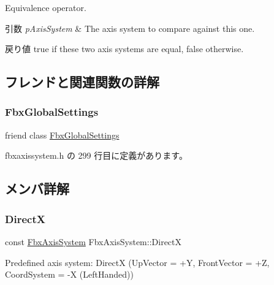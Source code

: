 Equivalence operator. 
\begin{DoxyParams}{引数}
{\em p\+Axis\+System} & The axis system to compare against this one. \\
\hline
\end{DoxyParams}
\begin{DoxyReturn}{戻り値}
{\ttfamily true} if these two axis systems are equal, {\ttfamily false} otherwise. 
\end{DoxyReturn}


\subsection{フレンドと関連関数の詳解}
\mbox{\label{class_fbx_axis_system_ac6f6b3953bf13718eb87110d614b3c9a}} 
\subsubsection{\texorpdfstring{Fbx\+Global\+Settings}{FbxGlobalSettings}}
{\footnotesize\ttfamily friend class \hyperlink{class_fbx_global_settings}{Fbx\+Global\+Settings}\hspace{0.3cm}{\ttfamily [friend]}}



 fbxaxissystem.\+h の 299 行目に定義があります。



\subsection{メンバ詳解}
\mbox{\label{class_fbx_axis_system_a2eddfe5afe7db5f56adee774c51559e9}} 
\subsubsection{\texorpdfstring{DirectX}{DirectX}}
{\footnotesize\ttfamily const \hyperlink{class_fbx_axis_system}{Fbx\+Axis\+System} Fbx\+Axis\+System\+::\+DirectX\hspace{0.3cm}{\ttfamily [static]}}



Predefined axis system\+: DirectX (Up\+Vector = +Y, Front\+Vector = +Z, Coord\+System = -\/X (Left\+Handed)) 



